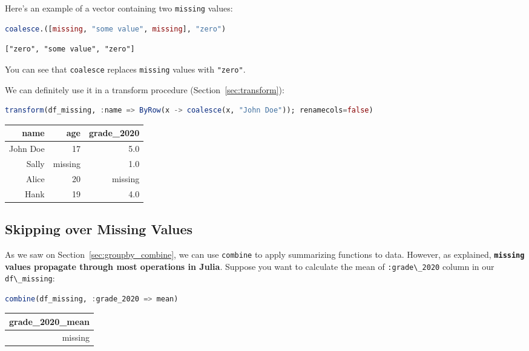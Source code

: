 \documentclass[
  notoc %
]{tufte-book}
\newcommand{\passthrough}[1]{#1}
\begin{document}
Here's an example of a vector containing two
\passthrough{\lstinline!missing!} values:

\begin{lstlisting}[language=Julia]
coalesce.([missing, "some value", missing], "zero")
\end{lstlisting}

\begin{lstlisting}[language=Output]
["zero", "some value", "zero"]
\end{lstlisting}

You can see that \passthrough{\lstinline!coalesce!} replaces
\passthrough{\lstinline!missing!} values with
\passthrough{\lstinline!"zero"!}.

We can definitely use it in a transform procedure
(Section~\ref{sec:transform}):

\begin{lstlisting}[language=Julia]
transform(df_missing, :name => ByRow(x -> coalesce(x, "John Doe")); renamecols=false)
\end{lstlisting}

\begin{longtable}[]{@{}rrr@{}}
\toprule
name & age & grade\_2020 \\
\midrule
\endhead
John Doe & 17 & 5.0 \\
Sally & missing & 1.0 \\
Alice & 20 & missing \\
Hank & 19 & 4.0 \\
\bottomrule
\end{longtable}

\hypertarget{sec:missing_skip}{%
\subsection{Skipping over Missing Values}\label{sec:missing_skip}}

As we saw on Section~\ref{sec:groupby_combine}, we can use
\passthrough{\lstinline!combine!} to apply summarizing functions to
data. However, as explained, \textbf{\passthrough{\lstinline!missing!}
values propagate through most operations in Julia}. Suppose you want to
calculate the mean of \passthrough{\lstinline!:grade\_2020!} column in
our \passthrough{\lstinline!df\_missing!}:

\begin{lstlisting}[language=Julia]
combine(df_missing, :grade_2020 => mean)
\end{lstlisting}

\begin{longtable}[]{@{}r@{}}
\toprule
grade\_2020\_mean \\
\midrule
\endhead
missing \\
\bottomrule
\end{longtable}
\end{document}
